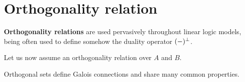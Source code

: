 \section{Orthogonality relation}\label{orthogonality-relation}

\textbf{Orthogonality relations} are used pervasively throughout linear
logic models, being often used to define somehow the duality operator
\((-)^\bot\).

Let us now assume an orthogonality relation over \(A\) and \(B\).

Orthogonal sets define Galois connections and share many common
properties.


